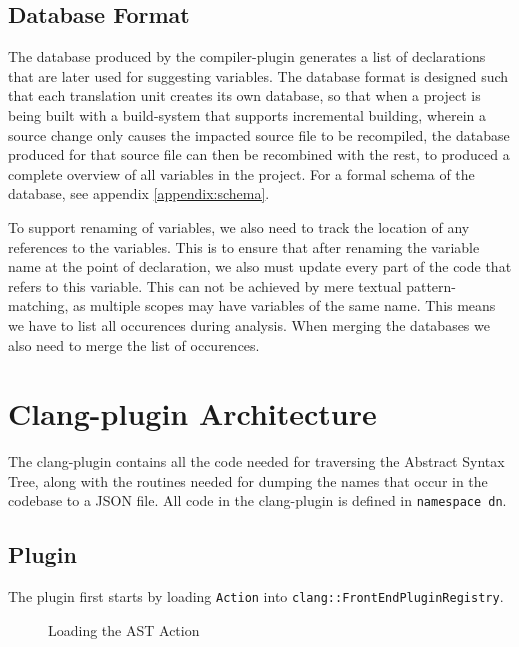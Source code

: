 \subsection{Database Format}
\label{sec:dbfmt}
The database produced by the compiler-plugin generates a list of declarations
that are later used for suggesting variables.
The database format is designed such that each translation unit creates its own
database, so that when a project is being built with a build-system that
supports incremental building, wherein a source change only causes the impacted
source file to be recompiled, the database produced for that source file can
then be recombined with the rest, to produced a complete overview of all
variables in the project. For a formal schema of the database, see
appendix \ref{appendix:schema}.

To support renaming of variables, we also need to track the location of any
references to the variables. This is to ensure that after renaming the
variable name at the point of declaration, we also must update every part of the
code that refers to this variable. This can not be achieved by mere textual
pattern-matching, as multiple scopes may have variables of the same name. This
means we have to list all occurences during analysis. When merging the databases
we also need to merge the list of occurences.

\section{Clang-plugin Architecture}

The clang-plugin contains all the code needed for traversing the Abstract
Syntax Tree, along with the routines needed for dumping the names that occur in
the codebase to a JSON file. All code in the clang-plugin is defined in
\lstinline|namespace dn|.

\subsection{Plugin}
The plugin first starts by loading \lstinline|Action| into
\lstinline|clang::FrontEndPluginRegistry|.

\begin{figure}[h]
	\label{fig:actionload}
	\caption{Loading the AST Action}
	\centering
\end{figure}

